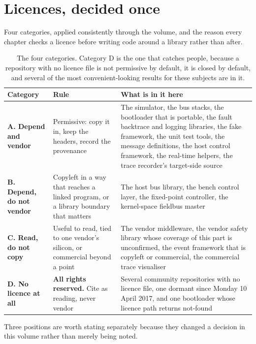 \section{Licences, decided once}

Four categories, applied consistently through the volume, and the reason every
chapter checks a licence before writing code around a library rather than after.

\begin{table}[H]\centering\small
\begin{tabular}{p{30mm}p{40mm}p{66mm}}
\toprule
Category & Rule & What is in it here \\
\midrule
\textbf{A. Depend and vendor} & Permissive: copy it in, keep the headers, record
the provenance & The simulator, the bus stacks, the bootloader that is portable,
the fault backtrace and logging libraries, the fake framework, the unit test
tools, the message definitions, the host control framework, the real-time
helpers, the trace recorder's target-side source \\
\textbf{B. Depend, do not vendor} & Copyleft in a way that reaches a linked
program, or a library boundary that matters & The host bus library, the bench
control layer, the fixed-point controller, the kernel-space fieldbus master \\
\textbf{C. Read, do not copy} & Useful to read, tied to one vendor's silicon, or
commercial beyond a point & The vendor middleware, the vendor safety library
whose coverage of this part is unconfirmed, the event framework that is copyleft
or commercial, the commercial trace visualiser \\
\textbf{D. No licence at all} & \textbf{All rights reserved.} Cite as reading,
never vendor & Several community repositories with no licence file, one dormant
since Monday 10 April 2017, and one bootloader whose licence path returns
not-found \\
\bottomrule
\end{tabular}
\caption{The four categories. Category D is the one that catches people, because a repository with no licence file is not permissive by default, it is closed by default, and several of the most convenient-looking results for these subjects are in it.}
\end{table}

Three positions are worth stating separately because they changed a decision in
this volume rather than merely being noted.

